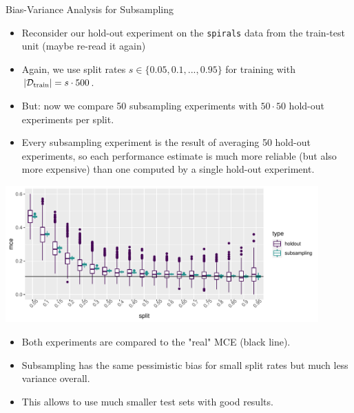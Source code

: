 \begin{vbframe}{Bias-Variance Analysis for Subsampling}

  \begin{itemize}
    \item Reconsider our hold-out experiment on the \texttt{spirals} data from 
    the train-test unit (maybe re-read it again)
    \item Again, we use split rates $s \in \{0.05, 0.1, ..., 0.95\}$ for 
    training with $|\mathcal{D}_{\text{train}}| = s \cdot 500$.
    \item But: now we compare 50 subsampling experiments with $50 \cdot 50$ 
    hold-out experiments per split.
    \item Every subsampling experiment is the result of averaging 50 hold-out 
    experiments, so each performance estimate is much more reliable (but also 
    more expensive) than one computed by a single hold-out experiment.
  \end{itemize}

\framebreak

\begin{center}
\includegraphics[width=0.9\textwidth]{figure/eval-resampling-example-1}
\end{center}



\begin{itemize}
  \item Both experiments are compared to the "real" MCE (black line).
  \item Subsampling has the same pessimistic bias for small split rates but 
  much less variance overall.
  \item This allows to use much smaller test sets with good results.
\end{itemize}

\framebreak


\end{vbframe}
